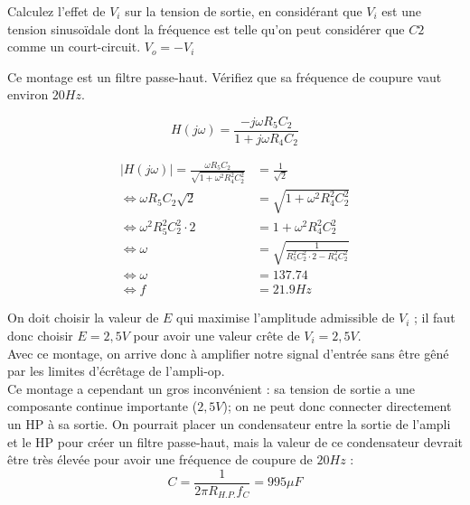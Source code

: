 \documentclass{../template/labo}
\begin{document}
\Question
{
Calculez l'effet de $V_i$ sur la tension de sortie, en considérant que $V_i$ est une tension sinusoïdale dont la fréquence est telle qu'on peut considérer que $C2$ comme un court-circuit.
}
{$V_o = -V_i$}

\Question
{
Ce montage est un filtre passe-haut. Vérifiez que sa fréquence de coupure vaut environ $20Hz$.
}
{
	$$H(j\omega) = \frac{-j\omega R_5 C_2}{1 + j\omega R_4 C_2}$$

	\begin{align*}
		|H(j\omega)| = \frac{\omega R_5 C_2}{\sqrt{1 + \omega^2 R_4^2 C_2^2}} &= \frac{1}{\sqrt{2}} \\
		\Leftrightarrow \omega R_5 C_2 \sqrt{2} &=\sqrt{1 + \omega^2 R_4^2 C_2^2} \\
		\Leftrightarrow \omega^2 R_5^2 C_2^2 \cdot 2 &= 1 + \omega^2 R_4^2 C_2^2 \\
		\Leftrightarrow \omega &= \sqrt{\frac{1}{R_5^2 C_2^2 \cdot 2 - R_4^2 C_2^2}}\\
		\Leftrightarrow \omega &= 137.74\\
		\Leftrightarrow f &= 21.9 Hz
	\end{align*}
}

On doit choisir la valeur de $E$ qui maximise l'amplitude admissible de $V_i$ ; il faut donc choisir $E = 2,5V$ pour avoir une valeur crête de $V_i = 2,5V$.\\
Avec ce montage, on arrive donc à amplifier notre signal d'entrée sans être gêné par les limites d'écrêtage de l'ampli-op.\\
Ce montage a cependant un gros inconvénient : sa tension de sortie a une composante continue importante ($2,5V$); on ne peut donc connecter directement un HP à sa sortie. On pourrait placer un condensateur entre la sortie de l'ampli et le HP pour créer un filtre passe-haut, mais la valeur de ce condensateur devrait être très élevée pour avoir une fréquence de coupure de $20Hz$ :
$$C=  \frac{1}{2 \pi R_{H.P.}f_C}=995\mu F$$
\end{document}
